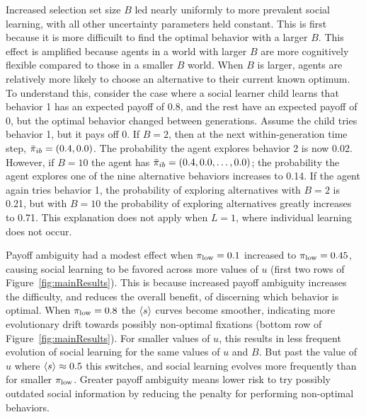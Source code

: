 \documentclass[letterpaper,11.5pt]{scrartcl}
\begin{document}
Increased selection set size $B$ led nearly uniformly to more prevalent social
learning, with all other uncertainty parameters held constant. This is first 
because it is more difficuilt to find the optimal behavior with a larger $B$.
This effect is amplified because agents in a world with larger $B$ are more
cognitively flexible compared to those in a smaller $B$ world. 
When $B$ is larger, agents are relatively more likely to choose an alternative to
their current known optimum. %
To understand this, consider the case where a social learner child learns
that behavior 1 has an expected payoff of 0.8, and the rest have an expected
payoff of 0, but the optimal behavior changed between generations. Assume
the child tries behavior 1, but it pays off 0.
If $B=2$, then at the next within-generation time step, $\bar\pi_{ib} = (0.4, 0.0)$. The probability
the agent explores behavior 2 is now 0.02. However, if $B=10$ the agent has
$\bar\pi_{ib} = (0.4, 0.0, \ldots, 0.0)$; the probability
the agent explores one of the nine alternative behaviors increases to 0.14.
If the agent again tries behavior 1, the probability of exploring alternatives
with $B=2$ is 0.21, but with $B=10$ the probability of exploring alternatives
greatly increases to 0.71. This explanation does not apply when $L=1$, where
individual learning does not occur. %

Payoff ambiguity had a modest effect when $\pi_{\mathrm{low}} = 0.1$ increased to $\pi_{\mathrm{low}} =
0.45$, causing social learning to be favored across more values of $u$ (first two rows of
Figure~\ref{fig:mainResults}).  This is because increased payoff ambiguity increases
the difficulty, and reduces the overall benefit, of discerning which behavior is
optimal.  When $\pi_{\mathrm{low}} = 0.8$ the
$\langle s \rangle$ curves become smoother, indicating more evolutionary drift towards 
possibly non-optimal fixations (bottom row of
Figure~\ref{fig:mainResults}). For smaller values of $u$, this results in less
frequent evolution of social learning for the same values of $u$ and $B$. But past
the value of $u$ where $\langle s \rangle \approx 0.5$ this switches, and social learning evolves more
frequently than for smaller $\pi_{\mathrm{low}}$. 
Greater payoff ambiguity means lower risk to try possibly outdated social
information by reducing the penalty for performing non-optimal behaviors. 
\end{document}
